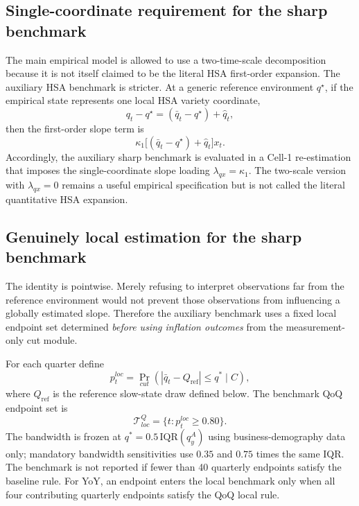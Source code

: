 \documentclass[11pt]{article}
\begin{document}
\subsection*{Single-coordinate requirement for the sharp benchmark}
The main empirical model is allowed to use a two-time-scale decomposition because it is not itself claimed to be the literal HSA first-order expansion. The auxiliary HSA benchmark is stricter. At a generic reference environment $q^\star$, if the empirical state represents one local HSA variety coordinate,
\begin{equation}
q_t-q^\star
=(\bar q_t-q^\star)+\hat q_t,
\end{equation}
then the first-order slope term is
\begin{equation}
\kappa_1\big[(\bar q_t-q^\star)+\hat q_t\big]x_t.
\label{eq:single_coordinate_slope}
\end{equation}
Accordingly, the auxiliary sharp benchmark is evaluated in a Cell-1 re-estimation that imposes the single-coordinate slope loading $\lambda_{qx}=\kappa_1$. The two-scale version with $\lambda_{qx}=0$ remains a useful empirical specification but is not called the literal quantitative HSA expansion.

\subsection*{Genuinely local estimation for the sharp benchmark}
The identity is pointwise. Merely refusing to interpret observations far from the reference environment would not prevent those observations from influencing a globally estimated slope. Therefore the auxiliary benchmark uses a fixed local endpoint set determined \emph{before using inflation outcomes} from the measurement-only cut module.

For each quarter define
\begin{equation}
p_t^{loc}
=
\Pr_{cut}\!\left(|\bar q_t-Q_{\mathrm{ref}}|\le q^\ast\mid C\right),
\end{equation}
where $Q_{\mathrm{ref}}$ is the reference slow-state draw defined below. The benchmark QoQ endpoint set is
\begin{equation}
\mathcal T_{loc}^Q=\{t:p_t^{loc}\ge0.80\}.
\label{eq:local_endpoint_set}
\end{equation}
The bandwidth is frozen at $q^\ast=0.5\,\mathrm{IQR}(q_y^A)$ using business-demography data only; mandatory bandwidth sensitivities use $0.35$ and $0.75$ times the same IQR. The benchmark is not reported if fewer than 40 quarterly endpoints satisfy the baseline rule. For YoY, an endpoint enters the local benchmark only when all four contributing quarterly endpoints satisfy the QoQ local rule.
\end{document}
